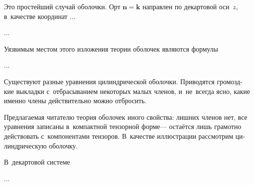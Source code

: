 
\begin{otherlanguage}{russian}

Это простейший случай оболочки. Орт ${\bm{n} = \bm{k}}$ направлен по декартовой оси~$z$, в~качестве координат ...

...



\end{otherlanguage}



\begin{otherlanguage}{russian}

Уязвимым местом этого изложения теории оболочек являются формулы

...



\end{otherlanguage}



\begin{otherlanguage}{russian}

Существуют разные уравнения цилиндрической оболочки. Приводятся громоздкие выкладки с~отбрасыванием некоторых малых членов, и~не~всегда ясно, какие именно члены действительно можно отбросить.

Предлагаемая читателю теория оболочек иного свойства: лишних членов нет, все уравнения записаны в~компактной тензорной форме\:--- остаётся лишь грамотно действовать с~компонентами тензоров. В~качестве иллюстрации рассмотрим цилиндрическую оболочку.

В~декартовой системе

...



\end{otherlanguage}

